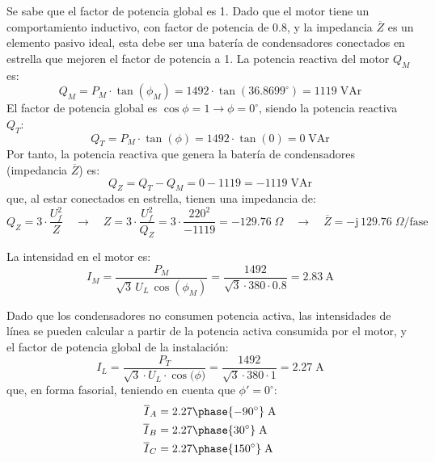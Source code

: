 Se sabe que el factor de potencia global es 1. Dado que el motor tiene
un comportamiento inductivo, con factor de potencia de $0.8$, y la
impedancia $\overline{Z}$ es un elemento pasivo ideal, {esta debe ser
  una batería de condensadores} conectados en estrella que mejoren el
factor de potencia a 1. La potencia reactiva del motor $Q_M$ es:
\begin{equation*}
  Q_M=P_M\cdot \tan(\phi_M)=1492\cdot \tan(36.8699^\circ)=1119\;\text{VAr}
\end{equation*}
El factor de potencia global es $\cos{\phi}=1\rightarrow\phi=0^\circ$,
siendo la potencia reactiva $Q_T$:
\begin{equation*}
  Q_T=P_M\cdot \tan(\phi)=1492\cdot \tan(0)=0\;\text{VAr}
\end{equation*}
Por tanto, la potencia reactiva que genera la batería de condensadores
(impedancia $\overline{Z}$) es:
\begin{equation*}
  Q_Z=Q_T-Q_M=0-1119=-1119\;\text{VAr}
\end{equation*}
que, al estar conectados en estrella, tienen una impedancia de:
\begin{equation*}
  Q_Z=3\cdot \dfrac{U_f^2}{Z} \quad\rightarrow\quad Z=3\cdot \dfrac{U_f^2}{Q_Z}=3\cdot \dfrac{220^2}{-1119}=-129.76\;\Omega \quad\rightarrow\quad \overline{Z}={-\mathrm{j}\,129.76}\;\Omega\text{/fase}
\end{equation*}

La intensidad en el motor es:
\begin{equation*}
  I_M=\dfrac{P_M}{\sqrt{3}\,U_L\,\cos(\phi_M)}=\dfrac{1492}{\sqrt{3}\cdot 380\cdot 0.8}= \qty{2.83}{\ampere}
\end{equation*}

Dado que los condensadores no consumen potencia activa, las
intensidades de línea se pueden calcular a partir de la potencia
activa consumida por el motor, y el factor de potencia global de la
instalación:
\begin{equation*}
  I_L=\dfrac{P_T}{\sqrt{3}\cdot U_L\cdot \cos{(\phi})}=\dfrac{1492}{\sqrt{3}\cdot 380\cdot 1}=2.27\;\text{A}
\end{equation*}
que, en forma fasorial, teniendo en cuenta que $\phi'=0^\circ$:
\begin{align*}
  \overline{I}_{A}&={2.27\phase{-90^\circ}\;\text{A}}\\
  \overline{I}_{B}&={2.27\phase{30^\circ}\;\text{A}}\\
  \overline{I}_{C}&={2.27\phase{150^\circ}\;\text{A}}
\end{align*}

